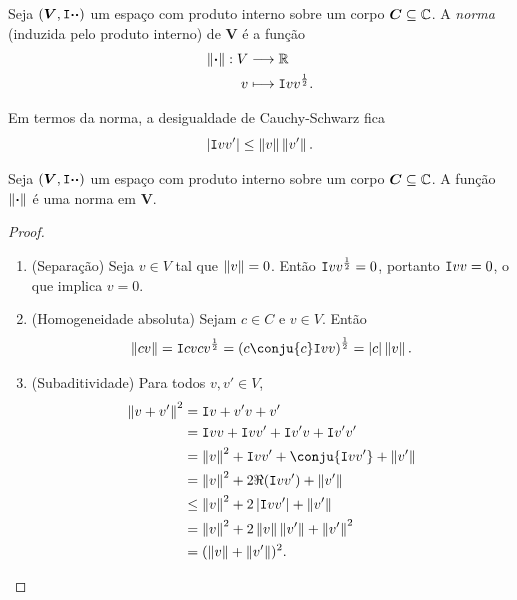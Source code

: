 \begin{defi}
Seja $(\bm V,\mathtt I{\bm{\cdot}}{\bm{\cdot}})$ um espaço com produto interno sobre um corpo $\bm C \subseteq \mathbb{C}$. A \emph{norma} (induzida pelo produto interno) de $\bm V$ é a função
	\begin{align*}
	{\left\Vert{\bm{\cdot}}\right\Vert}: {V} &\longrightarrow {\mathbb{R}} \\{v} &\longmapsto {\mathtt I{v}{v}^{\frac{1}{2}}}.
	\end{align*}
\end{defi}

Em termos da norma, a desigualdade de Cauchy-Schwarz fica
	\begin{equation*}
	\left\vert{\mathtt I{v}{v'}}\right\vert \leq \left\Vert{v}\right\Vert\left\Vert{v'}\right\Vert.
	\end{equation*}

\begin{prop}
Seja $(\bm V,\mathtt I{\bm{\cdot}}{\bm{\cdot}})$ um espaço com produto interno sobre um corpo $\bm C \subseteq \mathbb{C}$. A função $\left\Vert{\bm{\cdot}}\right\Vert$ é uma norma em $\bm V$.
\end{prop}
\begin{proof}
	\begin{enumerate}
	\item (Separação) Seja $v \in V$ tal que $\left\Vert{v}\right\Vert=0$. Então $\mathtt I{v}{v}^\frac{1}{2}=0$, portanto $\mathtt I{v}{v}=0$, o que implica $v=0$.

	\item (Homogeneidade absoluta) Sejam $c \in C$ e $v \in V$. Então
	\begin{equation*}
	\nor{cv} = \inte{cv}{cv}^{\frac{1}{2}} = \left(c\conju{c}\inte{v}{v}\right)^{\frac{1}{2}} = \abs{c}\nor{v}.
	\end{equation*}
	
	\item (Subaditividade) Para todos $v,v' \in V$,
	\begin{align*}
	\nor{v+v'}^2 &= \inte{v+v'}{v+v'} \\
		&= \inte{v}{v}+\inte{v}{v'}+\inte{v'}{v}+\inte{v'}{v'} \\
		&=  \nor{v}^2+\inte{v}{v'}+\conju{\inte{v}{v'}}+\nor{v'}\\
		&= \nor{v}^2+2\Re(\inte{v}{v'})+\nor{v'}\\
		&\leq \nor{v}^2+2\abs{\inte{v}{v'}}+\nor{v'}\\
		&= \nor{v}^2 + 2\nor{v}\nor{v'}+\nor{v'}^2 \\
		&= (\nor{v} + \nor{v'})^2. \qedhere
	\end{align*}
	\end{enumerate}
\end{proof}

